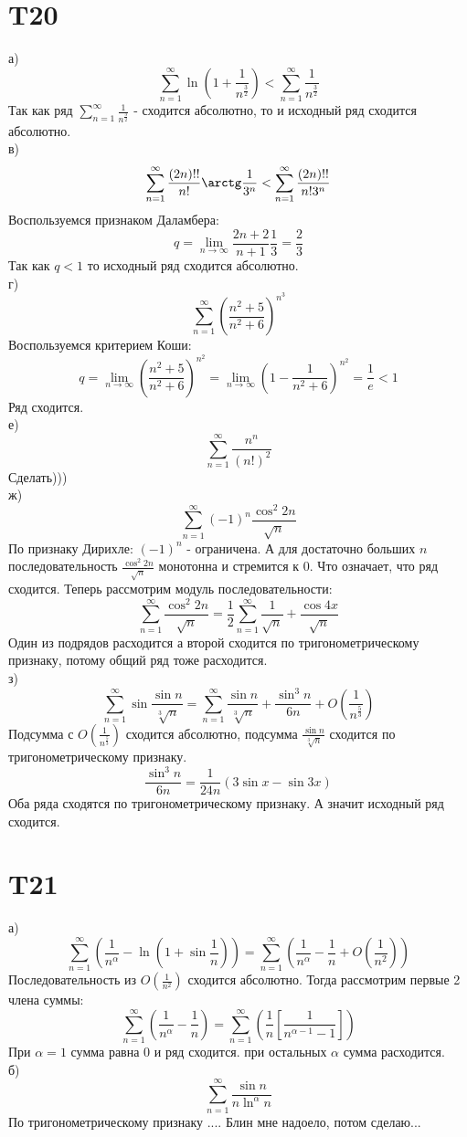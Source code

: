 \documentclass[12pt]{article}
\begin{document}
\section{T20}
а)
\[
    \sum_{n=1}^{\infty} \ln (1 + \frac{1}{n^{\frac{3}{2}}}) < \sum_{n=1}^{\infty} \frac{1}{n^{\frac{3}{2}}}
\]
Так как ряд $\sum_{n=1}^{\infty} \frac{1}{n^{\frac{3}{2}}}$ - сходится абсолютно, то и исходный ряд сходится абсолютно.\\
в)
\[
    \sum_{n=1}^{\infty} \frac{(2n)!!}{n!} \arctg \frac{1}{3^n} < \sum_{n=1}^{\infty} \frac{(2n)!!}{n! 3^n}
\]
Воспользуемся признаком Даламбера:
\[
    q = \lim_{n \to \infty} \frac{2n + 2}{n + 1} \frac{1}{3} = \frac{2}{3}
\]
Так как $q < 1$ то исходный ряд сходится абсолютно. \\
г) 
\[
    \sum_{n=1}^{\infty} \left( \frac{n^2 + 5}{n^2 + 6} \right)^{n^3}
\]
Воспользуемся критерием Коши:
\[
    q = \lim_{n \to \infty} \left( \frac{n^2 + 5}{n^2 + 6} \right)^{n^2} = \lim_{n \to \infty} \left( 1 - \frac{1}{n^2 + 6} \right)^{n^{2}} = \frac{1}{e} < 1
\]
Ряд сходится. \\
е)
\[
    \sum_{n=1}^{\infty} \frac{n^n}{(n!)^2}
\]
Сделать)))
\\
ж)
\[
    \sum_{n=1}^{\infty} (-1)^n \frac{\cos^2 2n}{\sqrt{n}}
\]
По признаку Дирихле: $(-1)^n $ - ограничена. А для достаточно больших $n$ последовательность 
$\frac{\cos ^2 2n}{\sqrt{n} }$ монотонна и стремится к 0. Что означает, что ряд сходится.  
Теперь рассмотрим модуль последовательности:
\[
    \sum_{n=1}^{\infty} \frac{\cos ^2 2n}{\sqrt{n} } = 
    \frac{1}{2}\sum_{n=1}^{\infty} \frac{1}{\sqrt{n}} + \frac{\cos 4x}{\sqrt{n} }
\]
Один из подрядов расходится а второй сходится по тригонометрическому признаку, потому общий ряд тоже расходится.
\\
з) 
\[
    \sum_{n=1}^{\infty} \sin \frac{\sin n}{\sqrt[3]{n}} = \sum_{n=1}^{\infty} \frac{\sin n}{\sqrt[3]{n}} + \frac{\sin^3 n}{6n} + O(\frac{1}{n^{\frac{5}{3}}})
\]
Подсумма с $O(\frac{1}{n^{\frac{5}{3}}})$ сходится абсолютно, подсумма $\frac{\sin n}{\sqrt[3]{n}}$ сходится по тригонометрическому признаку.
\[
    \frac{\sin^3 n}{6n} = \frac{1}{24n} \left( 3\sin x - \sin 3x \right) 
\]
Оба ряда сходятся по тригонометрическому признаку. А значит исходный ряд сходится.
\section{T21}
а)
\[
    \sum_{n=1}^{\infty} \left( \frac{1}{n^\alpha } - \ln (1 + \sin \frac{1}{n}) \right) = \sum_{n=1}^{\infty} \left( \frac{1}{n^\alpha} - \frac{1}{n} + O(\frac{1}{n^{2}}) \right) 
\]
Последовательность из $O(\frac{1}{n^2})$ сходится абсолютно. Тогда рассмотрим первые 2 члена суммы:
\[
    \sum_{n=1}^{\infty} \left( \frac{1}{n^\alpha } - \frac{1}{n} \right) = 
    \sum_{n=1}^{\infty} \left( \frac{1}{n} \left[\frac{1}{n^{\alpha-1} - 1}\right] \right) 
\] 
При $\alpha = 1$ сумма равна $0$ и ряд сходится.
при остальных $\alpha $ сумма расходится.
\\
б)
\[
    \sum_{n=1}^{\infty} \frac{\sin n}{n \ln^\alpha n}
\]
По тригонометрическому признаку .... 
Блин мне надоело, потом сделаю...
\end{document}
